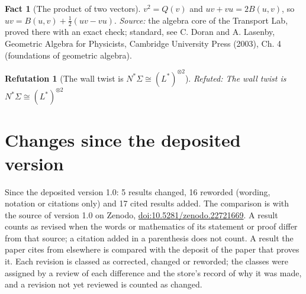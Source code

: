 \documentclass[11pt]{article}
\newtheorem{refutation}[theorem]{Refutation}
\theoremstyle{definition}
\newtheorem{fact}[theorem]{Fact}
\theoremstyle{plain}
\begin{document}
\begin{fact}[The product of two vectors]\label{c:std-algebra.vector-squares}
$v^{2} = Q(v)$ and $uv + vu = 2B(u, v)$, so $uv = B(u, v) + \tfrac12(uv - vu)$.
\emph{Source:} the algebra core of the Transport Lab, proved there with an exact check; standard, see C. Doran and A. Lasenby, Geometric Algebra for Physicists, Cambridge University Press (2003), Ch. 4 (foundations of geometric algebra).
\end{fact}

\begin{refutation}[The wall twist is $N^{*}\Sigma \cong (L^{*})^{\otimes 2}$]\label{c:refuted.the-wall-twist-is}
Refuted: The wall twist is $N^{*}\Sigma \cong (L^{*})^{\otimes 2}$
\end{refutation}

\section*{Changes since the deposited version}
Since the deposited version 1.0: 5 results changed, 16 reworded (wording, notation or citations only) and 17 cited results added. The comparison is with the source of version 1.0 on Zenodo, \href{https://doi.org/10.5281/zenodo.22721669}{doi:10.5281/zenodo.22721669}. A result counts as revised when the words or mathematics of its statement or proof differ from that source; a citation added in a parenthesis does not count. A result the paper cites from elsewhere is compared with the deposit of the paper that proves it. Each revision is classed as corrected, changed or reworded; the classes were assigned by a review of each difference and the store's record of why it was made, and a revision not yet reviewed is counted as changed.
\end{document}

